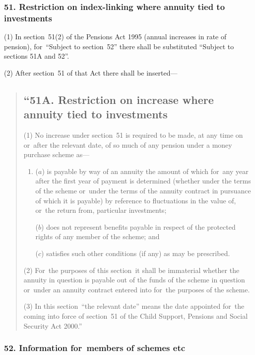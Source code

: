 \documentclass[12pt,a4paper]{article}
\begin{document}
\subsubsection{51. Restriction on index-linking where annuity tied to investments}

(1) In section~51(2)  of the Pensions Act 1995 (annual increases in rate of pension), for~“Subject to section~52” there shall be substituted “Subject to sections 51A and 52”.

(2) After section~51 of that Act there shall be inserted—
\begin{quotation}
\subsection*{\sloppy “51A. Restriction on increase where annuity tied to investments}

(1) No increase under section~51 is required to be made, at any time on or~after the relevant date, of so much of any pension under a money purchase scheme as—
\begin{enumerate}\item[]
($a$) is payable by way of an annuity the amount of which for~any year after the first year of payment is determined (whether under the terms of the scheme or~under the terms of the annuity contract in pursuance of which it is payable) by reference to fluctuations in the value of, or~the return from, particular investments;

($b$) does not represent benefits payable in respect of the protected rights of any member of the scheme; and

($c$) satisfies such other conditions (if any) as may be prescribed.
\end{enumerate}

(2) For~the purposes of this section~it shall be immaterial whether the annuity in question is payable out of the funds of the scheme in question or~under an annuity contract entered into for~the purposes of the scheme.

(3) In this section~“the relevant date” means the date appointed for~the coming into force of section~51 of the Child Support, Pensions and Social Security Act 2000.”
\end{quotation}

\subsubsection{52. Information for~members of schemes etc}
\end{document}
